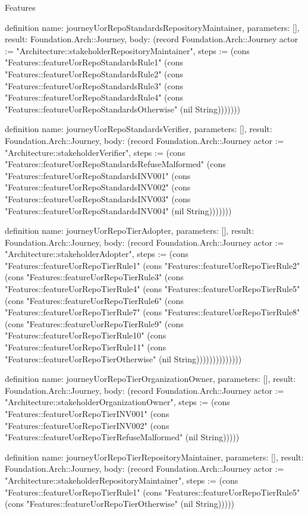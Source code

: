 \begin{lexlean}{Features}
\begin{semanticmodule}
definition{
  name: journeyUorRepoStandardsRepositoryMaintainer,
  parameters: [],
  result: Foundation.Arch::Journey,
  body: (record Foundation.Arch::Journey {actor := "Architecture::stakeholderRepositoryMaintainer", steps := (cons "Features::featureUorRepoStandardsRule1" (cons "Features::featureUorRepoStandardsRule2" (cons "Features::featureUorRepoStandardsRule3" (cons "Features::featureUorRepoStandardsRule4" (cons "Features::featureUorRepoStandardsOtherwise" (nil String))))))})
}

definition{
  name: journeyUorRepoStandardsVerifier,
  parameters: [],
  result: Foundation.Arch::Journey,
  body: (record Foundation.Arch::Journey {actor := "Architecture::stakeholderVerifier", steps := (cons "Features::featureUorRepoStandardsRefuseMalformed" (cons "Features::featureUorRepoStandardsINV001" (cons "Features::featureUorRepoStandardsINV002" (cons "Features::featureUorRepoStandardsINV003" (cons "Features::featureUorRepoStandardsINV004" (nil String))))))})
}

definition{
  name: journeyUorRepoTierAdopter,
  parameters: [],
  result: Foundation.Arch::Journey,
  body: (record Foundation.Arch::Journey {actor := "Architecture::stakeholderAdopter", steps := (cons "Features::featureUorRepoTierRule1" (cons "Features::featureUorRepoTierRule2" (cons "Features::featureUorRepoTierRule3" (cons "Features::featureUorRepoTierRule4" (cons "Features::featureUorRepoTierRule5" (cons "Features::featureUorRepoTierRule6" (cons "Features::featureUorRepoTierRule7" (cons "Features::featureUorRepoTierRule8" (cons "Features::featureUorRepoTierRule9" (cons "Features::featureUorRepoTierRule10" (cons "Features::featureUorRepoTierRule11" (cons "Features::featureUorRepoTierOtherwise" (nil String)))))))))))))})
}

definition{
  name: journeyUorRepoTierOrganizationOwner,
  parameters: [],
  result: Foundation.Arch::Journey,
  body: (record Foundation.Arch::Journey {actor := "Architecture::stakeholderOrganizationOwner", steps := (cons "Features::featureUorRepoTierINV001" (cons "Features::featureUorRepoTierINV002" (cons "Features::featureUorRepoTierRefuseMalformed" (nil String))))})
}

definition{
  name: journeyUorRepoTierRepositoryMaintainer,
  parameters: [],
  result: Foundation.Arch::Journey,
  body: (record Foundation.Arch::Journey {actor := "Architecture::stakeholderRepositoryMaintainer", steps := (cons "Features::featureUorRepoTierRule1" (cons "Features::featureUorRepoTierRule5" (cons "Features::featureUorRepoTierOtherwise" (nil String))))})
}


\end{semanticmodule}
\end{lexlean}
